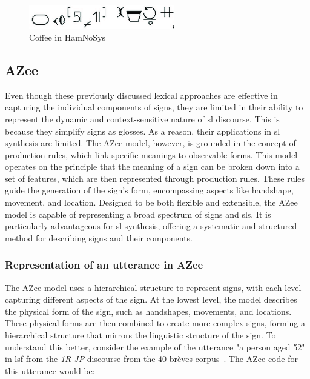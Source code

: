 \documentclass[../../main.tex]{subfiles}
\begin{document}
\begin{figure}[h]
  \centering \includegraphics[width = 2.5in]{chapters/background_work/images/hamnosys_coffee.png}
  \caption{Coffee in HamNoSys}
  \label{fig:hamnosys_coffee}
\end{figure}

\subsection{AZee}
\label{ch:background_work:sign_language_descriptions:azee}

Even though these previously discussed lexical approaches are effective in capturing the individual components of signs, they are limited in their ability to represent the dynamic and context-sensitive nature of \gls{sl} discourse. This is because they simplify signs as \gls{glosses}. As a reason, their applications in \gls{sl} synthesis are limited. The AZee model, however, is grounded in the concept of production rules, which link specific meanings to observable forms. This model operates on the principle that the meaning of a sign can be broken down into a set of features, which are then represented through production rules. These rules guide the generation of the sign's form, encompassing aspects like handshape, movement, and location. Designed to be both flexible and extensible, the AZee model is capable of representing a broad spectrum of signs and \gls{sl}s. It is particularly advantageous for \gls{sl} synthesis, offering a systematic and structured method for describing signs and their components.


\subsubsection{Representation of an \gls{utterance} in AZee}
\label{ch:background_work:sign_language_descriptions:azee:representation}

The AZee model uses a hierarchical structure to represent signs, with each level capturing different aspects of the sign. At the lowest level, the model describes the physical form of the sign, such as handshapes, movements, and locations. These physical forms are then combined to create more complex signs, forming a hierarchical structure that mirrors the linguistic structure of the sign. To understand this better, consider the example of the \gls{utterance} "a person aged 52" in \gls{lsf} from the \emph{1R-JP} discourse from the 40 brèves corpus~\cite{challant2022first}. The AZee code for this \gls{utterance} would be:
\end{document}

